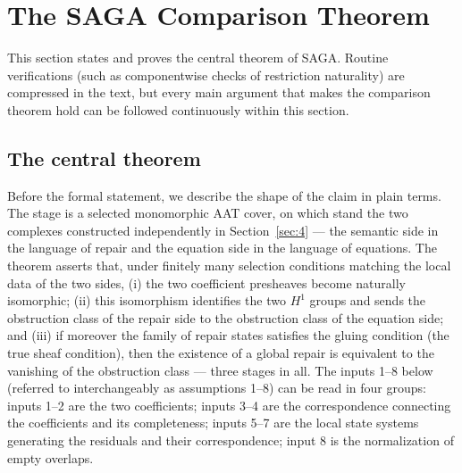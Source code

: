 \section{The SAGA Comparison Theorem}\label{sec:5}

This section states and proves the central theorem of SAGA. Routine
verifications (such as componentwise checks of restriction naturality)
are compressed in the text, but every main argument that makes the
comparison theorem hold can be followed continuously within this
section.

\subsection{The central theorem}\label{sec:51}

Before the formal statement, we describe the shape of the claim in
plain terms. The stage is a selected monomorphic AAT cover, on which
stand the two complexes constructed independently in
Section~\ref{sec:4} --- the semantic side in the language of repair and
the equation side in the language of equations. The theorem asserts
that, under finitely many selection conditions matching the local data
of the two sides, (i) the two coefficient presheaves become naturally
isomorphic; (ii) this isomorphism identifies the two $H^1$ groups and
sends the obstruction class of the repair side to the obstruction class
of the equation side; and (iii) if moreover the family of repair states
satisfies the gluing condition (the true sheaf condition), then the
existence of a global repair is equivalent to the vanishing of the
obstruction class --- three stages in all. The inputs 1--8 below
(referred to interchangeably as assumptions 1--8) can be read in four
groups: inputs 1--2 are the two coefficients; inputs 3--4
are the correspondence connecting the coefficients and its
completeness; inputs 5--7 are the local state systems generating the
residuals and their correspondence; input 8 is the normalization of
empty overlaps.

